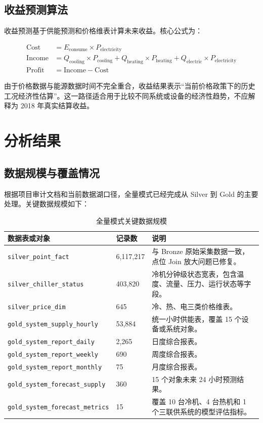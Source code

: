 \documentclass[UTF8,11pt,a4paper]{ctexart}
\newcommand{\code}[1]{\texttt{#1}}
\begin{document}
\subsection{收益预测算法}

收益预测基于供能预测和价格维表计算未来收益。核心公式为：

\[
\begin{aligned}
  \mathrm{Cost} &= E_{\mathrm{consume}} \times P_{\mathrm{electricity}} \\
  \mathrm{Income} &= Q_{\mathrm{cooling}} \times P_{\mathrm{cooling}}
  + Q_{\mathrm{heating}} \times P_{\mathrm{heating}}
  + Q_{\mathrm{electric}} \times P_{\mathrm{electricity}} \\
  \mathrm{Profit} &= \mathrm{Income} - \mathrm{Cost}
\end{aligned}
\]

由于价格数据与能源数据时间不完全重合，收益结果表示“当前价格政策下的历史工况经济性估算”。这一路径适合用于比较不同系统或设备的经济性趋势，不应解释为 2018 年真实结算收益。

\section{分析结果}

\subsection{数据规模与覆盖情况}

根据项目审计文档和当前数据湖口径，全量模式已经完成从 Silver 到 Gold 的主要处理。关键数据规模如下：

\begin{table}[H]
\centering
\small
\begin{tabularx}{\textwidth}{p{4.3cm}p{3.2cm}Y}
\toprule
数据表或对象 & 记录数 & 说明 \\
\midrule
\code{silver\_point\_fact} & 6,117,217 & 与 Bronze 原始采集数据一致，点位 Join 放大问题已修复。 \\
\code{silver\_chiller\_status} & 403,820 & 冷机分钟级状态宽表，包含温度、流量、压力、运行状态等字段。 \\
\code{silver\_price\_dim} & 645 & 冷、热、电三类价格维表。 \\
\code{gold\_system\_supply\_hourly} & 53,884 & 统一小时供能表，覆盖 15 个设备或系统对象。 \\
\code{gold\_system\_report\_daily} & 2,265 & 日度综合报表。 \\
\code{gold\_system\_report\_weekly} & 690 & 周度综合报表。 \\
\code{gold\_system\_report\_monthly} & 75 & 月度综合报表。 \\
\code{gold\_system\_forecast\_supply} & 360 & 15 个对象未来 24 小时预测结果。 \\
\code{gold\_system\_forecast\_metrics} & 15 & 覆盖 10 台冷机、4 台热机和 1 个三联供系统的模型评估指标。 \\
\bottomrule
\end{tabularx}
\caption{全量模式关键数据规模}
\end{table}
\end{document}
